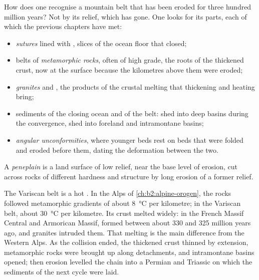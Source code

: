 How does one recognise a mountain belt that has been eroded for three hundred million years?
Not by its relief, which has gone. One looks for its parts, each of which the previous
chapters have met:
\begin{itemize}
\item \emph{sutures} lined with \emph{}, slices of the ocean floor that closed;
\item belts of \emph{metamorphic rocks}, often of high grade, the roots of the thickened crust,
now at the surface because the kilometres above them were eroded;
\item \emph{granites} and \emph{}, the products of the crustal melting that
thickening and heating bring;
\item sediments of the closing ocean and of the belt: \emph{} shed into deep basins
during the convergence, \emph{} shed into foreland and intramontane basins;
\item \emph{angular unconformities}, where younger beds rest on beds that were folded and
eroded before them, dating the deformation between the two.
\end{itemize}

\begin{definition}[Peneplain]\label{def:b2:wilson-cycle:peneplain}
A \emph{peneplain} is a land surface of low relief, near the base level of
erosion, cut across rocks of different hardness and structure by long erosion of a former
relief.
\end{definition}

The Variscan belt is a hot . In the Alps of \cref{ch:b2:alpine-orogen}, the rocks
followed metamorphic gradients of about \qty{8}{\celsius} per kilometre; in the Variscan belt,
about \qty{30}{\celsius} per kilometre. Its crust melted widely: in the French Massif Central
and Armorican Massif,  formed between about 330 and 325 million years ago, and
granites intruded them. That melting is the main difference from the Western Alps. As the
collision ended, the thickened crust thinned by extension, metamorphic rocks were brought up
along detachments, and intramontane basins opened; then erosion levelled the chain into a
Permian and Triassic  on which the sediments of the next cycle were laid.

